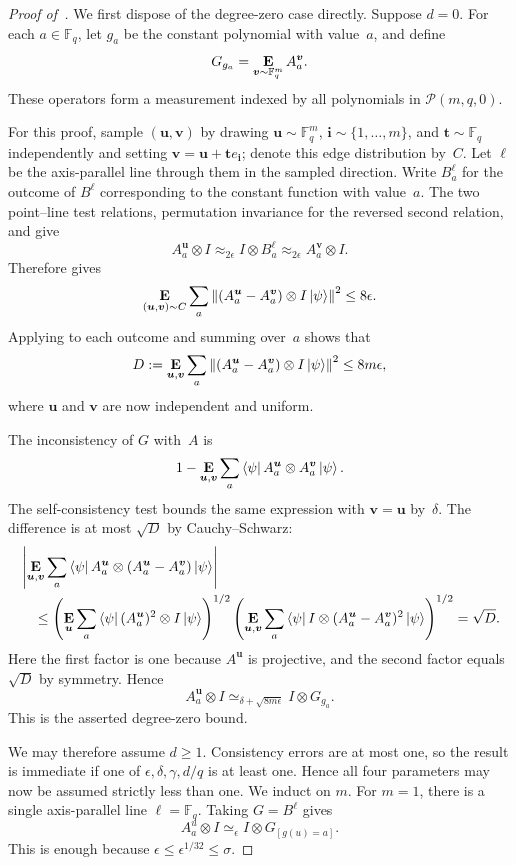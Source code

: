 \documentclass[11pt]{article}
\theoremstyle{definition}
\newcommand{\E}{\mathop{\bf E\/}}
\newcommand{\F}{\mathbb F}
\newcommand{\eps}{\epsilon}
\newcommand{\calP}{\mathcal{P}}
\newcommand{\bi}{\boldsymbol{i}}
\newcommand{\bt}{\boldsymbol{t}}
\newcommand{\bu}{\boldsymbol{u}}
\newcommand{\bv}{\boldsymbol{v}}
\newcommand{\polyfunc}[3]{\calP(#1, #2, #3)}
\begin{document}
\begin{proof}[Proof of~]
We first dispose of the degree-zero case directly.  Suppose $d=0$.
For each $a\in\F_q$, let $g_a$ be the constant polynomial with value~$a$,
and define
\[
 G_{g_a}=\E_{\bv\sim\F_q^m}A^{\bv}_a.
\]
These operators form a measurement indexed by all polynomials in
$\polyfunc{m}{q}{0}$.

For this proof, sample $(\bu,\bv)$ by drawing
$\bu\sim\F_q^m$, $\bi\sim\{1,\ldots,m\}$, and $\bt\sim\F_q$
independently and setting $\bv=\bu+\bt e_{\bi}$; denote this edge
distribution by~$C$.  Let $\ell$ be the axis-parallel line through them
in the sampled direction.  Write $B^\ell_a$ for the outcome of $B^\ell$
corresponding to the constant function with value~$a$.  The two
point--line test relations, permutation invariance for the reversed
second relation, and  give
\[
 A^{\bu}_a\otimes I\approx_{2\eps}I\otimes B^\ell_a
 \approx_{2\eps}A^{\bv}_a\otimes I.
\]
Therefore  gives
\[
 \E_{(\bu,\bv)\sim C}\sum_a
 \left\|(A^{\bu}_a-A^{\bv}_a)\otimes I\ket\psi\right\|^2
 \leq8\eps.
\]
Applying  to each outcome and summing over~$a$
shows that
\begin{equation}\label{eq:d-zero-global-variance}
 D:=\E_{\bu,\bv}\sum_a
 \left\|(A^{\bu}_a-A^{\bv}_a)\otimes I\ket\psi\right\|^2
 \leq8m\eps,
\end{equation}
where $\bu$ and $\bv$ are now independent and uniform.

The inconsistency of $G$ with~$A$ is
\[
 1-\E_{\bu,\bv}\sum_a
 \bra\psi A^{\bu}_a\otimes A^{\bv}_a\ket\psi.
\]
The self-consistency test bounds the same expression with $\bv=\bu$
by~$\delta$.  The difference is at most $\sqrt D$ by Cauchy--Schwarz:
\begin{align*}
 &\left|\E_{\bu,\bv}\sum_a
 \bra\psi A^{\bu}_a\otimes(A^{\bu}_a-A^{\bv}_a)\ket\psi\right|\\
 &\quad\leq
 \left(\E_{\bu}\sum_a\bra\psi(A^{\bu}_a)^2\otimes I\ket\psi\right)^{1/2}
 \left(\E_{\bu,\bv}\sum_a\bra\psi I\otimes
 (A^{\bu}_a-A^{\bv}_a)^2\ket\psi\right)^{1/2}
 =\sqrt D.
\end{align*}
Here the first factor is one because $A^{\bu}$ is projective, and
the second factor equals $\sqrt D$ by symmetry.  Hence
\[
 A^{\bu}_a\otimes I\simeq_{\delta+\sqrt{8m\eps}}I\otimes G_{g_a}.
\]
This is the asserted degree-zero bound.

We may therefore assume $d\geq1$.
Consistency errors are at most one, so the result is immediate if one
of $\eps,\delta,\gamma,d/q$ is at least one.  Hence all four parameters
may now be assumed strictly less than one.
We induct on $m$.  For $m=1$, there is a single axis-parallel line
$\ell=\F_q$.  Taking $G=B^\ell$ gives
\[
 A^u_a\otimes I\simeq_{\eps}I\otimes G_{[g(u)=a]}.
\]
This is enough because $\eps\leq\eps^{1/32}\leq\sigma$.


\end{proof}
\end{document}
